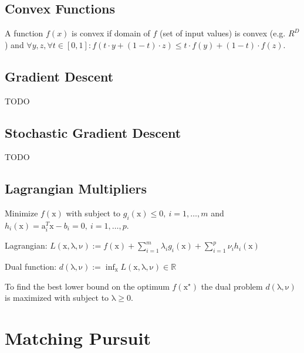 \documentclass[a4paper, 11pt, landscape]{article}
\newcommand{\matr}[1]{\boldsymbol{\mathrm{#1}}}
\begin{document}
\begin{multicols*}{3}
\subsection{Convex Functions}
A function $f(x)$ is convex if domain of $f$ (set of input values) is convex (e.g. $R^D$) and $\forall y, z, \forall t \in [0, 1]: f(t \cdot y + (1-t) \cdot z) \leq t \cdot f(y) + (1-t) \cdot f(z)$.
\subsection{Gradient Descent}
TODO

\subsection{Stochastic Gradient Descent}
TODO

\subsection{Lagrangian Multipliers}
Minimize  $f(\matr{x})$ with subject to $g_i(\matr{x}) \leq 0,\ i = 1, \ldots, m$ and $h_i(\matr{x}) = \matr{a}_i^T \matr{x} - b_i = 0,\ i = 1, \ldots, p$.
\begin{compactdesc}
	\item[Lagrangian:] $L(\matr{x}, \matr{\lambda}, \matr{\nu}) := f(\matr{x}) + \sum_{i=1}^m \lambda_i g_i(\matr{x}) + \sum_{i=1}^p \nu_i h_i(\matr{x})$
	\item[Dual function:] $d(\matr{\lambda}, \matr{\nu}) := \inf_{\matr{x}} L(\matr{x}, \matr{\lambda}, \matr{\nu}) \in \mathbb{R}$
\end{compactdesc}
To find the best lower bound on the optimum $f(\matr{x}^\star)$ the dual problem $d(\matr{\lambda}, \matr{\nu})$ is maximized with subject to $\matr{\lambda} \geq \matr{0}$.

\section{Matching Pursuit}

\end{multicols*}
\end{document}
